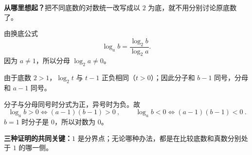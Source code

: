 \begin{proofbox}
  \textbf{从哪里想起？}把不同底数的对数统一改写成以 $2$ 为底，就不用分别讨论原底数了。
  \begin{description}[style=nextline,leftmargin=2.4em,labelsep=0.45em,itemsep=0.35em]
    \item[第一步：换底。]由换底公式
      \[\log_a b=\frac{\log_2 b}{\log_2 a}.\]
      因为 $a\neq1$，所以分母 $\log_2 a\neq0$。
    \item[第二步：分别判号。]由于底数 $2>1$，$\log_2 t$ 与 $t-1$ 正负相同（$t>0$）；因此分子和 $b-1$ 同号，分母和 $a-1$ 同号。
    \item[第三步：看分式正负。]分子与分母同号时分式为正，异号时为负。故
      \[\boxed{\ \log_a b>0\iff(a-1)(b-1)>0\ },\qquad
        \boxed{\ \log_a b<0\iff(a-1)(b-1)<0\ }.\]
      $b=1$ 时分子是 $0$，所以对数为 $0$。
  \end{description}
  \begin{center}
  
  \end{center}
  \textbf{\textcolor{CProof}{三种证明的共同关键：}}$1$ 是分界点；无论哪种办法，都是在比较底数和真数分别处于 $1$ 的哪一侧。
\end{proofbox}
